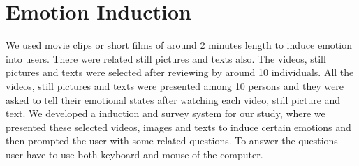 
\chapter{Emotion Induction}
We used movie clips or short films of around 2 minutes length to induce emotion into users. There were related still pictures and texts also. The videos, still pictures and texts were selected after reviewing by around 10 individuals. All the videos, still pictures and texts were presented among 10 persons and they were asked to tell their emotional states after watching each video, still picture and text. We developed a induction and survey system for our study, where we presented these selected videos, images and texts to induce certain emotions and then prompted the user with some related questions. To answer the questions user have to use both keyboard and mouse of the computer.
